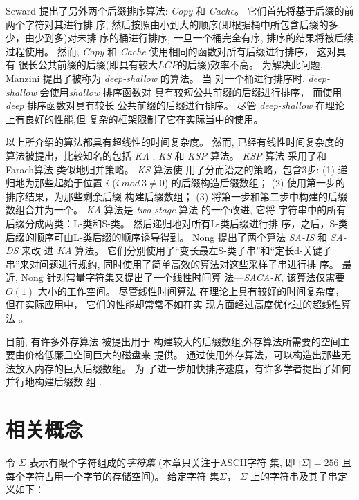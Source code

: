 Seward \cite{Seward2000} 提出了另外两个后缀排序算法:
\emph{Copy} 和 \emph{Cache}。 它们首先将基于后缀的前两个字符对其进行排
序, 然后按照由小到大的顺序(即根据桶中所包含后缀的多少，由少到多)对未排
序的桶进行排序, 一旦一个桶完全有序, 排序的结果将被后续过程使用。 然而,
\emph{Copy} 和 \emph{Cache} 使用相同的函数对所有后缀进行排序， 这对具有
很长公共前缀的后缀(即具有较大$LCP$的后缀)效率不高。 为解决此问题,
Manzini \cite{Manzini2004} 提出了被称为 \emph{deep-shallow} 的算法。 当
对一个桶进行排序时, \emph{deep-shallow} 会使用\emph{shallow} 排序函数对
具有较短公共前缀的后缀进行排序， 而使用 \emph{deep} 排序函数对具有较长
公共前缀的后缀进行排序。 尽管 \emph{deep-shallow} 在理论上有良好的性能,但
复杂的框架限制了它在实际当中的使用。

以上所介绍的算法都具有超线性的时间复杂度。 然而, 已经有线性时间复杂度的
算法被提出，比较知名的包括 \emph{KA} \cite{Ko2005}, \emph{KS}
\cite{Karkkainen2006} 和 \emph{KSP}\cite{Kim2005} 算法。 \emph{KSP} 算法
采用了和Farach算法 \cite{Farach1997} 类似地归并策略。 \emph{KS} 算法使
用了分而治之的策略，包含3步: (1) 递归地为那些起始于位置 $i$ ($i~mod~3
\neq 0$) 的后缀构造后缀数组； (2) 使用第一步的排序结果，为那些剩余后缀
构建后缀数组； (3) 将第一步和第二步中构建的后缀数组合并为一个。
\emph{KA} 算法是 \emph{two-stage} 算法\cite{Itoh1999} 的一个改进, 它将
字符串中的所有后缀分成两类：L-类和S-类。 然后递归地对所有L-类后缀进行排
序，之后，S-类后缀的顺序可由L-类后缀的顺序诱导得到。 Nong
\cite{Nong2011}提出了两个算法 \emph{SA-IS} 和 \emph{SA-DS} 来改
进 \emph{KA} 算法。 它们分别使用了“变长最左S-类子串”和“定长d-关键子
串”来对问题进行规约, 同时使用了简单高效的算法对这些采样子串进行排
序。 最近, Nong\cite{Nong2013} 针对常量字符集又提出了一个线性时间算
法---\emph{SACA-K}, 该算法仅需要 $O(1)$ 大小的工作空间。 尽管线性时间算法
在理论上具有较好的时间复杂度，但在实际应用中， 它们的性能却常常不如在实
现方面经过高度优化过的超线性算法 \cite{Rajasekaran2014}。

目前, 有许多外存算法\cite{Karkkainen2014,Nong2014,Nong2015} 被提出用于
构建较大的后缀数组,外存算法所需要的空间主要由价格低廉且空间巨大的磁盘来
提供。 通过使用外存算法，可以构造出那些无法放入内存的巨大后缀数组。 为
了进一步加快排序速度，有许多学者提出了如何并行地构建后缀数
组 \cite{Schmidt2016,Metwally2016,Flick2015,Deo2013}.

\section{相关概念}
\label{sec:3_RC}

令 $\Sigma$ 表示有限个字符组成的\emph{字符集} (本章只关注于ASCII字符
集, 即 $|\Sigma| = 256$ 且每个字符占用一个字节的存储空间)。 给定字符
集$\Sigma$， $\Sigma$ 上的字符串及其子串定义如下：

